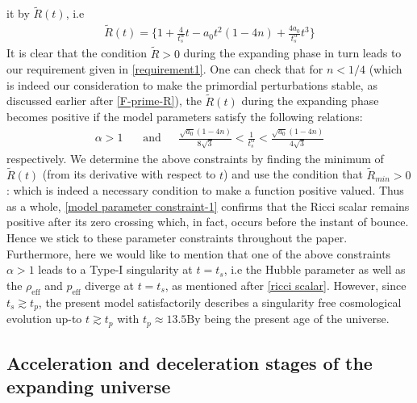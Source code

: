 \documentclass{article}
\begin{document}
it by $\widetilde{R}(t)$, i.e
\begin{eqnarray}
 \widetilde{R}(t) = \bigg\{1 + \frac{4}{t_s^{\alpha}}t - a_0t^2\left(1 - 4n\right) + \frac{4a_0}{t_s^{\alpha}}t^3\bigg\}
 \label{tilde-R}
\end{eqnarray}
It is clear that the condition $\widetilde{R} > 0$ during the expanding phase in turn leads to our requirement given in \ref{requirement1}. 
One can check that for $n < 1/4$ (which is indeed our consideration to make the primordial perturbations stable, as discussed 
earlier after \ref{F-prime-R}), the $\widetilde{R}(t)$ during the expanding phase becomes positive if the model parameters 
satisfy the following relations:
\begin{eqnarray}
 \alpha > 1~~~~~~~~\mathrm{and}~~~~~~~
 \frac{\sqrt{a_0}\left(1 - 4n\right)}{8\sqrt{3}} < \frac{1}{t_s^{\alpha}} < \frac{\sqrt{a_0}\left(1 - 4n\right)}{4\sqrt{3}}
 \label{model parameter constraint-1}
\end{eqnarray}
respectively. We determine the above constraints by finding the minimum of $\widetilde{R}(t)$ (from its derivative with respect to $t$) 
and use the condition that $\widetilde{R}_{min} > 0$ : which is indeed a necessary condition to make a function positive valued. Thus as a whole, 
\ref{model parameter constraint-1} confirms that the Ricci scalar remains positive after its zero crossing which, in fact, 
occurs before the instant of bounce. Hence we stick to these parameter constraints throughout the paper. Furthermore, here we would like to mention 
that one of the above constraints $\alpha > 1$ leads to a Type-I singularity at $t = t_s$, i.e the Hubble parameter as well as 
the $\rho_\mathrm{eff}$ and $p_\mathrm{eff}$ diverge at $t = t_s$, as mentioned after \ref{ricci scalar}. However, since $t_s \gtrsim t_p$, the 
present model satisfactorily describes a singularity free cosmological evolution up-to $t \gtrsim t_p$ with $t_p \approx 13.5\mathrm{By}$ 
being the present age of the universe.

\subsection{Acceleration and deceleration stages of the expanding universe}
\end{document}
